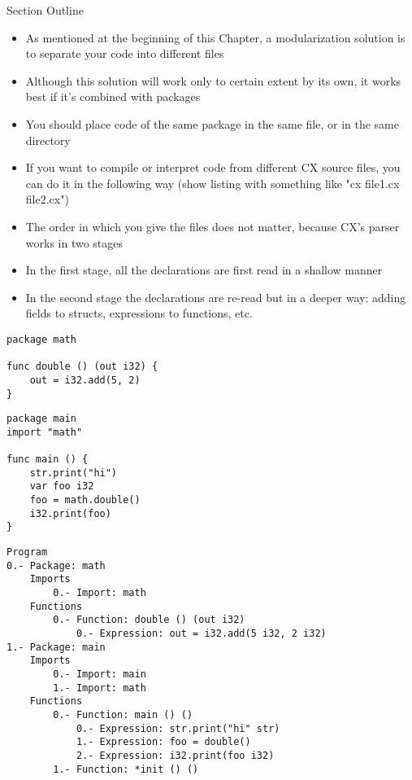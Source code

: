\documentclass[11pt,fleqn,openany]{book} %
\begin{document}
\begin{remark}
Section Outline
    \begin{itemize}
    	\item As mentioned at the beginning of this Chapter, a modularization solution is to separate your code into different files
        \item Although this solution will work only to certain extent by its own, it works best if it's combined with packages
        \item You should place code of the same package in the same file, or in the same directory
        \item If you want to compile or interpret code from different CX source files, you can do it in the following way (show listing with something like "cx file1.cx file2.cx")
        \item The order in which you give the files does not matter, because CX's parser works in two stages
        \item In the first stage, all the declarations are first read in a shallow manner
        \item In the second stage the declarations are re-read but in a deeper way: adding fields to structs, expressions to functions, etc.
    \end{itemize}
\end{remark}

\begin{lstlisting}[caption={Package to be Imported},captionpos=b,label={listing:import-example}]
package math

func double () (out i32) {
	out = i32.add(5, 2)
}
\end{lstlisting}

\begin{lstlisting}[caption={Main Package},captionpos=b,label={listing:main-package-example}]
package main
import "math"

func main () {
	str.print("hi")
	var foo i32
	foo = math.double()
	i32.print(foo)
}
\end{lstlisting}

\begin{lstlisting}[caption={Resulting Abstract Syntax Tree},captionpos=b,label={listing:resulting-ast}]
Program
0.- Package: math
	Imports
		0.- Import: math
	Functions
		0.- Function: double () (out i32)
			0.- Expression: out = i32.add(5 i32, 2 i32)
1.- Package: main
	Imports
		0.- Import: main
		1.- Import: math
	Functions
		0.- Function: main () ()
			0.- Expression: str.print("hi" str)
			1.- Expression: foo = double()
			2.- Expression: i32.print(foo i32)
		1.- Function: *init () ()
\end{lstlisting}
\end{document}
